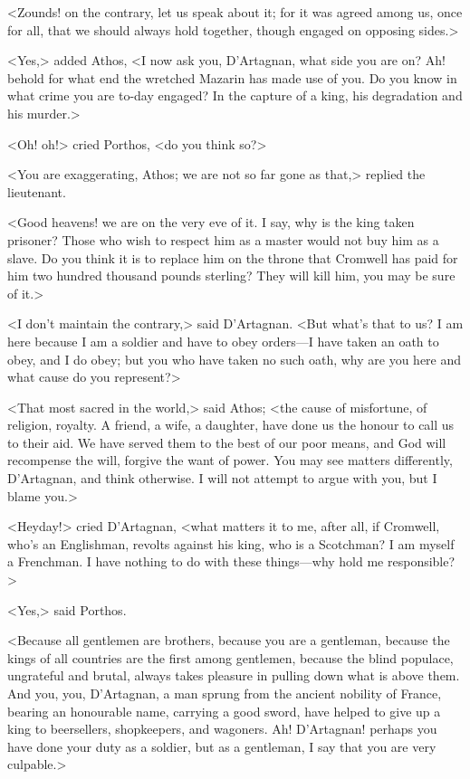 <Zounds! on the contrary, let us speak about it; for it was agreed among us, once for all, that we should always hold together, though engaged on opposing sides.>

<Yes,> added Athos, <I now ask you, D'Artagnan, what side you are on? Ah! behold for what end the wretched Mazarin has made use of you. Do you know in what crime you are to-day engaged? In the capture of a king, his degradation and his murder.>

<Oh! oh!> cried Porthos, <do you think so?>

<You are exaggerating, Athos; we are not so far gone as that,> replied the lieutenant.

<Good heavens! we are on the very eve of it. I say, why is the king taken prisoner? Those who wish to respect him as a master would not buy him as a slave. Do you think it is to replace him on the throne that Cromwell has paid for him two hundred thousand pounds sterling? They will kill him, you may be sure of it.>

<I don't maintain the contrary,> said D'Artagnan. <But what's that to us? I am here because I am a soldier and have to obey orders—I have taken an oath to obey, and I do obey; but you who have taken no such oath, why are you here and what cause do you represent?>

<That most sacred in the world,> said Athos; <the cause of misfortune, of religion, royalty. A friend, a wife, a daughter, have done us the honour to call us to their aid. We have served them to the best of our poor means, and God will recompense the will, forgive the want of power. You may see matters differently, D'Artagnan, and think otherwise. I will not attempt to argue with you, but I blame you.>

<Heyday!> cried D'Artagnan, <what matters it to me, after all, if Cromwell, who's an Englishman, revolts against his king, who is a Scotchman? I am myself a Frenchman. I have nothing to do with these things—why hold me responsible?>

<Yes,> said Porthos.

<Because all gentlemen are brothers, because you are a gentleman, because the kings of all countries are the first among gentlemen, because the blind populace, ungrateful and brutal, always takes pleasure in pulling down what is above them. And you, you, D'Artagnan, a man sprung from the ancient nobility of France, bearing an honourable name, carrying a good sword, have helped to give up a king to beersellers, shopkeepers, and wagoners. Ah! D'Artagnan! perhaps you have done your duty as a soldier, but as a gentleman, I say that you are very culpable.>

